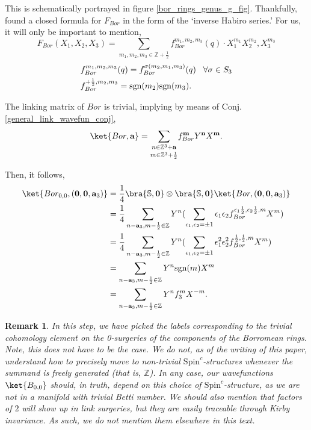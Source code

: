 \documentclass{article}
\newcommand{\Z}{{\mathbb Z}}
\newtheorem{remark}{Remark}[section]
\numberwithin{corollary}{theorem}
\numberwithin{corollary}{proposition}
\begin{document}
This is schematically portrayed in figure \ref{bor_rings_genus_g_fig}. Thankfully, \cite{S2} found a closed formula for $F_{Bor}$ in the form of  the `inverse Habiro series.' For us, it will only be important to mention,
$$F_{Bor}(X_1,X_2,X_3) = \sum_{m_1,m_2,m_3\in \mathbb{Z}+\frac{1}{2}} f^{m_1,m_2,m_3}_{Bor}(q) \cdot  X_1^{m_1} X_2^{m_2},X_3^{m_3}$$
\begin{align*}
&f^{m_1,m_2,m_3}_{Bor}(q) = f^{\sigma(m_2,m_1,m_3)}_{Bor}(q) \hspace{3mm} \forall\sigma\in S_3\\
&f^{+\frac{1}{2},m_2,m_3}_{Bor}=\mathrm{sgn}(m_2)\mathrm{sgn}(m_3).
\end{align*}


The linking matrix of $Bor$ is trivial, implying by means of Conj. \ref{general_link_wavefun_conj},
$$\ket{Bor,\mathbf{a}} = \underset{m\in \Z^3+\frac{1}{2}}{\sum_{n\in \Z^3+\mathbf{a}}} f^{\mathbf{m}}_{Bor} Y^\mathbf{n} X^{\mathbf{m}}.$$

Then, it follows,
\begin{align*}
\ket{Bor_{0,0},(\mathbf{0},\mathbf{0},\mathbf{a}_3)} & = \frac{1}{4} \bra{\mathbb{S},\mathbf{0}}\otimes \bra{\mathbb{S},\mathbf{0}} \ket{Bor,(\mathbf{0},\mathbf{0},\mathbf{a}_3)} \\ &= \frac{1}{4} \sum_{n-\mathbf{a}_3,m-\frac{1}{2}\in \Z} Y^n (\sum_{\epsilon_1,\epsilon_2=\pm1} \epsilon_1 \epsilon_2 f^{\epsilon_1 \frac{1}{2},\epsilon_2 \frac{1}{2},m}_{Bor} X^m)\\
&=\frac{1}{4} \sum_{n-\mathbf{a}_3,m-\frac{1}{2}\in \Z} Y^n (\sum_{\epsilon_1,\epsilon_2=\pm1} \epsilon_1^2 \epsilon_2^2f^{ \frac{1}{2}, \frac{1}{2},m}_{Bor} X^m)\\
&=\sum_{n-\mathbf{a}_3,m-\frac{1}{2}\in \Z} Y^n \mathrm{sgn}(m) X^m \\
&= \sum_{n-\mathbf{a}_3,m-\frac{1}{2}\in \Z} Y^n f^m_{3} X^{-m}.
\end{align*}

\begin{remark}
    In this step, we have picked the labels corresponding to the trivial cohomology element on the 0-surgeries of the components of the Borromean rings. Note, this does \textit{not} have to be the case. We do not, as of the writing of this paper, understand how to precisely move to non-trivial $\mathrm{Spin}^{c}$-structures whenever the summand is freely generated (that is, $\mathbb{Z}$). In any case, our wavefunctions $\ket{B_{0,0}}$ should, in truth, depend on this choice of $\mathrm{Spin}^{c}$-structure, as we are not in a manifold with trivial Betti number. We should also mention that factors of $2$ will show up in link surgeries, but they are easily traceable through Kirby invariance. As such, we do not mention them elsewhere in this text.
\end{remark}
\end{document}
